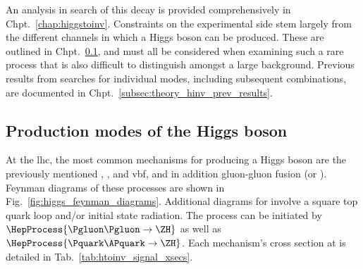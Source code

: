 
An analysis in search of this decay is provided comprehensively in Chpt.~\ref{chap:higgstoinv}. Constraints on the experimental side stem largely from the different channels in which a Higgs boson can be produced. These are outlined in Chpt.~\ref{subsec:theory_higgs_production_modes}, and must all be considered when examining such a rare process that is also difficult to distinguish amongst a large background. Previous results from searches for individual modes, including subsequent combinations, are documented in Chpt.~\ref{subsec:theory_hinv_prev_results}.




\subsection{Production modes of the Higgs boson}
\label{subsec:theory_higgs_production_modes}

At the \acrshort{lhc}, the most common mechanisms for producing a Higgs boson are the previously mentioned \ttH, \VH, and \acrshort{vbf}, and in addition gluon-gluon fusion (\ggF or \ggH). Feynman diagrams of these processes are shown in Fig.~\ref{fig:higgs_feynman_diagrams}. Additional diagrams for \ggH involve a square top quark loop and/or initial state radiation. The \ZH process can be initiated by $\HepProcess{\Pgluon\Pgluon\to \ZH}$ as well as $\HepProcess{\Pquark\APquark \to \ZH}$. Each mechanism's cross section at \comruntwo is detailed in Tab.~\ref{tab:htoinv_signal_xsecs}.

